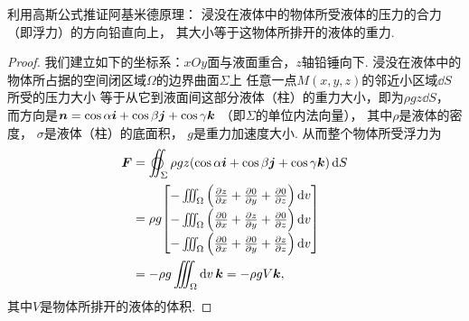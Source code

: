 \begin{example}
利用高斯公式推证阿基米德原理：
浸没在液体中的物体所受液体的压力的合力（即浮力）的方向铅直向上，
其大小等于这物体所排开的液体的重力.
\begin{proof}
我们建立如下的坐标系：\(xOy\)面与液面重合，\(z\)轴铅锤向下.
浸没在液体中的物体所占据的空间闭区域\(\Omega\)的边界曲面\(\Sigma\)上
任意一点\(M(x,y,z)\)的邻近小区域\(\dd{S}\)所受的压力大小
等于从它到液面间这部分液体（柱）的重力大小，即为\(\rho g z \dd{S}\)，
而方向是\(\boldsymbol{n}=\cos\alpha\boldsymbol{i}+\cos\beta\boldsymbol{j}+\cos\gamma\boldsymbol{k}\)
（即\(\Sigma\)的单位内法向量），
其中\(\rho\)是液体的密度，
\(\sigma\)是液体（柱）的底面积，
\(g\)是重力加速度大小.
从而整个物体所受浮力为\begin{align*}
	\vb{F}
	&= \varoiint_\Sigma \rho g z
		(\cos\alpha\vb{i}+\cos\beta\vb{j}+\cos\gamma\vb{k}) \dd{S} \\
	&= \rho g {\def\arraystretch{1.5} \begin{bmatrix}
			-\iiint_\Omega \left( \pdv{z}{x} + \pdv{0}{y} + \pdv{0}{z} \right) \dd{v} \\
			-\iiint_\Omega \left( \pdv{0}{x} + \pdv{z}{y} + \pdv{0}{z} \right) \dd{v} \\
			-\iiint_\Omega \left( \pdv{0}{x} + \pdv{0}{y} + \pdv{z}{z} \right) \dd{v}
		\end{bmatrix}} \\
	&= -\rho g \iiint_\Omega \dd{v} \vb{k}
	= -\rho g V \vb{k},
\end{align*}
其中\(V\)是物体所排开的液体的体积.
\end{proof}
\end{example}
